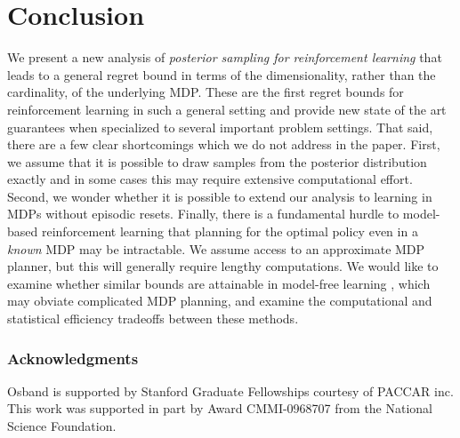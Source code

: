 \documentclass{article}
\begin{document}
\section{Conclusion}
We present a new analysis of \emph{posterior sampling for reinforcement learning} that leads to a general regret bound in terms of the dimensionality, rather than the cardinality, of the underlying MDP.
These are the first regret bounds for reinforcement learning in such a general setting and provide new state of the art guarantees when specialized to several important problem settings.
That said, there are a few clear shortcomings which we do not address in the paper.
First, we assume that it is possible to draw samples from the posterior distribution exactly and in some cases this may require extensive computational effort.
Second, we wonder whether it is possible to extend our analysis to learning in MDPs without episodic resets.
Finally, there is a fundamental hurdle to model-based reinforcement learning that planning for the optimal policy even in a \emph{known} MDP may be intractable.
We assume access to an approximate MDP planner, but this will generally require lengthy computations.
We would like to examine whether similar bounds are attainable in model-free learning \cite{van2014generalization}, which may obviate complicated MDP planning, and examine the computational and statistical efficiency tradeoffs between these methods.

\subsubsection*{Acknowledgments}
Osband is supported by Stanford Graduate Fellowships courtesy of PACCAR inc.
This work was supported in part by Award CMMI-0968707 from the National Science Foundation.


\newpage
\small{


}
\newpage
\end{document}
